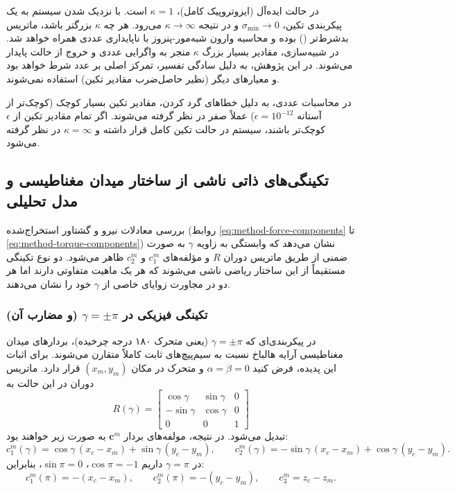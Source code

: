 در حالت ایده‌آل (ایزوتروپیک کامل)، $\kappa = 1$ است. با نزدیک شدن سیستم به یک پیکربندی تکین، $\sigma_{\min} \to 0$ و در نتیجه $\kappa \to \infty$ می‌رود. هر چه $\kappa$ بزرگتر باشد، ماتریس بدشرط‌تر () بوده و محاسبه وارون شبه‌مور-پنروز با ناپایداری عددی همراه خواهد شد. در شبیه‌سازی، مقادیر بسیار بزرگ $\kappa$ منجر به واگرایی عددی و خروج از حالت پایدار می‌شوند. در این پژوهش، به دلیل سادگی تفسیر، تمرکز اصلی بر عدد شرط خواهد بود و معیارهای دیگر (نظیر حاصل‌ضرب مقادیر تکین) استفاده نمی‌شوند.

در محاسبات عددی، به دلیل خطاهای گرد کردن، مقادیر تکین بسیار کوچک (کوچک‌تر از آستانه $\epsilon = 10^{-12}$) عملاً صفر در نظر گرفته می‌شوند. اگر تمام مقادیر تکین از $\epsilon$ کوچک‌تر باشند، سیستم در حالت تکین کامل قرار داشته و $\kappa = \infty$ در نظر گرفته می‌شود.

\subsection{تکینگی‌های ذاتی ناشی از ساختار میدان مغناطیسی و مدل تحلیلی}
\label{subsec:method-singularity-analysis}

بررسی معادلات نیرو و گشتاور استخراج‌شده (روابط \ref{eq:method-force-components} تا \ref{eq:method-torque-components}) نشان می‌دهد که وابستگی به زاویه $\gamma$ به صورت ضمنی از طریق ماتریس دوران $R$ و مؤلفه‌های $c^m_1$ و $c^m_2$ ظاهر می‌شود. دو نوع تکینگی مستقیماً از این ساختار ریاضی ناشی می‌شوند که هر یک ماهیت متفاوتی دارند اما هر دو در مجاورت زوایای خاصی از $\gamma$ خود را نشان می‌دهند.

\subsubsection{تکینگی فیزیکی در $\gamma = \pm\pi$ (و مضارب آن)}

در پیکربندی‌ای که $\gamma = \pm\pi$ (یعنی متحرک ۱۸۰ درجه چرخیده)، بردارهای میدان مغناطیسی آرایه هالباخ نسبت به سیم‌پیچ‌های ثابت کاملاً متقارن می‌شوند. برای اثبات این پدیده، فرض کنید $\alpha = \beta = 0$ و متحرک در مکان $(x_m, y_m)$ قرار دارد. ماتریس دوران در این حالت به
\[
R(\gamma) = \begin{bmatrix}
	\cos\gamma & \sin\gamma & 0 \\
	-\sin\gamma & \cos\gamma & 0 \\
	0 & 0 & 1
\end{bmatrix}
\]
تبدیل می‌شود. در نتیجه، مولفه‌های بردار $\mathbf{c}^m$ به صورت زیر خواهند بود:
\[
c_1^m(\gamma) = \cos\gamma\,(x_c - x_m) + \sin\gamma\,(y_c - y_m),\qquad
c_2^m(\gamma) = -\sin\gamma\,(x_c - x_m) + \cos\gamma\,(y_c - y_m).
\]
در $\gamma = \pi$ داریم $\cos\pi = -1$، $\sin\pi = 0$، بنابراین:
\[
c_1^m(\pi) = -(x_c - x_m),\qquad c_2^m(\pi) = -(y_c - y_m),\qquad c_3^m = z_c - z_m.
\]

